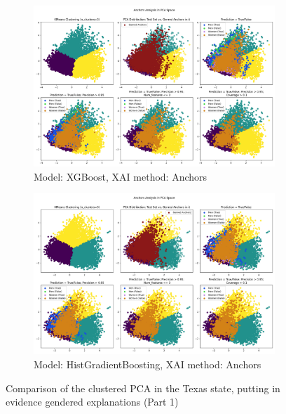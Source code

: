 \begin{figure}[h]
    \centering
    \begin{subfigure}[b]{1.0\textwidth}
        \includegraphics[width=\textwidth]{Images/clustered_pca/clusters_xg_tx_anchors.png}
        \caption{Model: XGBoost, XAI method: Anchors}
        \label{fig:clusters_xg_tx_anchors}
    \end{subfigure}

    \begin{subfigure}[b]{1.0\textwidth}
        \includegraphics[width=\textwidth]{Images/clustered_pca/clusters_skrub_tx_anchors.png}
        \caption{Model: HistGradientBoosting, XAI method: Anchors}
        \label{fig:clusters_skrub_tx_anchors}
    \end{subfigure}
    \caption{Comparison of the clustered PCA in the Texas state, putting in evidence gendered explanations (Part 1)}
\end{figure}

